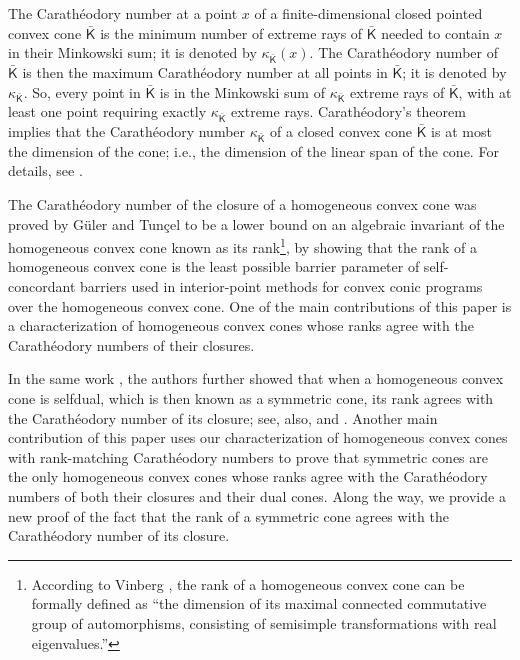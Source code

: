 \documentclass[oneside]{amsart}
\theoremstyle{plain}
\theoremstyle{definition}
\theoremstyle{remark}
\numberwithin{equation}{section}
\begin{document}
The Carath\'eodory number at a point $x$ of a finite-dimensional closed
pointed convex cone $\bar{\mathsf{K}}$ is the minimum number of extreme
rays of $\bar{\mathsf{K}}$ needed to contain $x$ in their Minkowski sum; it
is denoted by $\kappa_{\bar{\mathsf{K}}}(x)$. The Carath\'eodory number of
$\bar{\mathsf{K}}$ is then the maximum Carath\'eodory number at all points
in $\bar{\mathsf{K}}$; it is denoted by $\kappa_{\bar{\mathsf{K}}}$. So,
every point in $\bar{\mathsf{K}}$ is in the Minkowski sum of
$\kappa_{\bar{\mathsf{K}}}$ extreme rays of $\bar{\mathsf{K}}$, with at
least one point requiring exactly $\kappa_{\bar{\mathsf{K}}}$ extreme rays.
Carath\'eodory's theorem implies that the Carath\'eodory number
$\kappa_{\bar{\mathsf{K}}}$ of a closed convex cone $\bar{\mathsf{K}}$ is
at most the dimension of the cone; i.e., the dimension of the linear span
of the cone. For details, see \cite[\S17]{Rock97}.

The Carath\'eodory number of the closure of a homogeneous convex cone was
proved by G\"{u}ler and Tun\c{c}el \cite{GulTun98} to be a lower bound on
an algebraic invariant of the homogeneous convex cone known as its
rank\footnote{According to Vinberg \cite[p.~377]{Vin63}, the rank of a
homogeneous convex cone can be formally defined as ``the dimension of its
maximal connected commutative group of automorphisms, consisting of
semisimple transformations with real eigenvalues.''}, by showing that the
rank of a homogeneous convex cone is the least possible barrier parameter
of self-concordant barriers used in interior-point methods for convex conic
programs over the homogeneous convex cone. One of the main contributions of
this paper is a characterization of homogeneous convex cones whose ranks
agree with the Carath\'eodory numbers of their closures.

In the same work \cite{GulTun98}, the authors further showed that when a
homogeneous convex cone is selfdual, which is then known as a symmetric
cone, its rank agrees with the Carath\'eodory number of its closure; see,
also, \cite[Theorem~8]{TruongTun04} and \cite[Theorem~13]{ItoLou17}.
Another main contribution of this paper uses our characterization of
homogeneous convex cones with rank-matching Carath\'eodory numbers to prove
that symmetric cones are the only homogeneous convex cones whose ranks
agree with the Carath\'eodory numbers of both their closures and their dual
cones. Along the way, we provide a new proof of the fact that the rank of a
symmetric cone agrees with the Carath\'eodory number of its closure.
\end{document}
